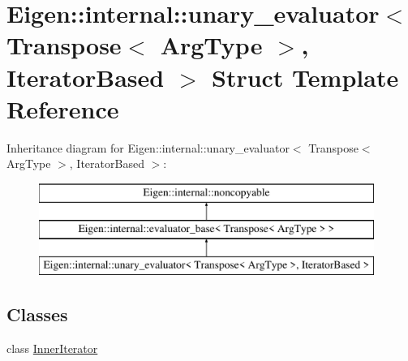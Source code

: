 \hypertarget{struct_eigen_1_1internal_1_1unary__evaluator_3_01_transpose_3_01_arg_type_01_4_00_01_iterator_based_01_4}{}\section{Eigen\+::internal\+::unary\+\_\+evaluator$<$ Transpose$<$ Arg\+Type $>$, Iterator\+Based $>$ Struct Template Reference}
\label{struct_eigen_1_1internal_1_1unary__evaluator_3_01_transpose_3_01_arg_type_01_4_00_01_iterator_based_01_4}
Inheritance diagram for Eigen\+::internal\+::unary\+\_\+evaluator$<$ Transpose$<$ Arg\+Type $>$, Iterator\+Based $>$\+:\begin{figure}[H]
\begin{center}
\leavevmode
\includegraphics[height=3.000000cm]{struct_eigen_1_1internal_1_1unary__evaluator_3_01_transpose_3_01_arg_type_01_4_00_01_iterator_based_01_4}
\end{center}
\end{figure}
\subsection*{Classes}
\begin{DoxyCompactItemize}
\item 
class \mbox{\hyperlink{class_eigen_1_1internal_1_1unary__evaluator_3_01_transpose_3_01_arg_type_01_4_00_01_iterator_based_01_4_1_1_inner_iterator}{Inner\+Iterator}}
\end{DoxyCompactItemize}
